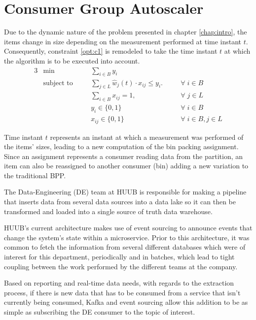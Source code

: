 \chapter{Consumer Group Autoscaler} \label{chap:consumer_group_autoscaler}

Due to the dynamic nature of the problem presented in chapter \ref{chap:intro},
the items change in size depending on the measurement performed at time instant
$t$. Consequently, constraint \ref{opt:c1} is remodeled to take the time instant
$t$ at which the algorithm is to be executed into account.
\begin{alignat}{3}
\label{BPP model}
    &\min       
        &&\sum_{i \in B} y_i 
            && \\
    &\text{subject to} \quad
        && \sum_{j \in L} \hat w_j(t) \cdot x_{ij} \leq y_i. \quad      
            && \forall \; i \in B \\
    &   && \sum_{i \in B} x_{ij} = 1, \quad                             
            && \forall \; j \in L \\
    &   && y_i \in \{0, 1\}                                             
            && \forall \; i \in B \\
    &   && x_{ij} \in \{0,1\}                                           
            && \forall \; i \in B, j \in L
\end{alignat}

Time instant $t$ represents an instant at which a measurement was performed
of the items' sizes, leading to a new computation of the bin packing assignment.
Since an assignment represents a consumer reading data from the partition, an
item can also be reassigned to another consumer (bin) adding a new variation to the
traditional BPP. 

The Data-Engineering (DE) team at HUUB is responsible for making a pipeline that
inserts data from several data sources into a data lake so it can then be
transformed and loaded into a single source of truth data warehouse. 

HUUB's current architecture makes use of event sourcing to announce events that
change the system's state within a microservice. Prior to this architecture, it
was common to fetch the information from several different databases which were
of interest for this department, periodically and in batches, which lead to
tight coupling between the work performed by the different teams at the company.

Based on reporting and real-time data needs, with regards to the extraction
process, if there is new data that has to be consumed from a service that isn't
currently being consumed, Kafka and event sourcing allow this addition to be as
simple as subscribing the DE consumer to the topic of interest.


